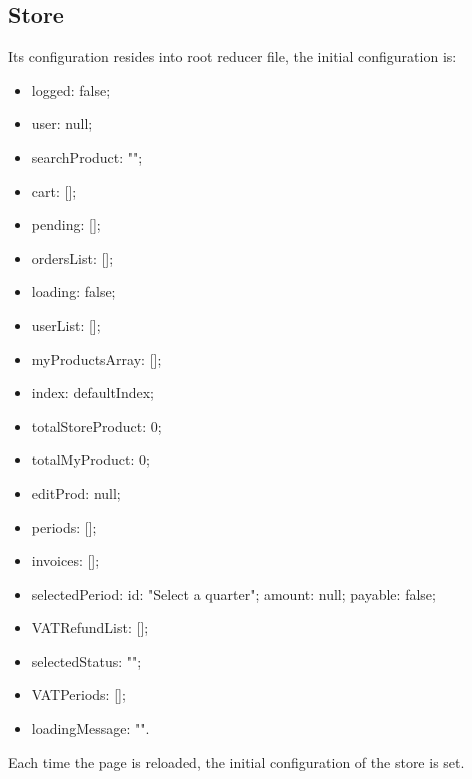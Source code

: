 \subsection{Store}
Its configuration resides into root reducer file, the initial configuration is:
\begin{itemize}
	\item logged: false;
	
	\item user: null;
	
	\item searchProduct: "";
	
	\item cart: [];
	
	\item pending: [];
	
	\item ordersList: [];
	
	\item loading: false;
	
	\item userList: [];
	
	\item myProductsArray: [];
	
	\item index: defaultIndex;
	
	\item totalStoreProduct: 0;
	
	\item totalMyProduct: 0;
	
	\item editProd: null;
	
	\item periods: [];
	
	\item invoices: [];
	
	\item selectedPeriod: {id: "Select a quarter"; amount: null; payable: false};
	
	\item VATRefundList: [];
	
	\item selectedStatus: "";
	
	\item VATPeriods: [];
	
	\item loadingMessage: "".
\end{itemize}
Each time the page is reloaded, the initial configuration of the store is set.

